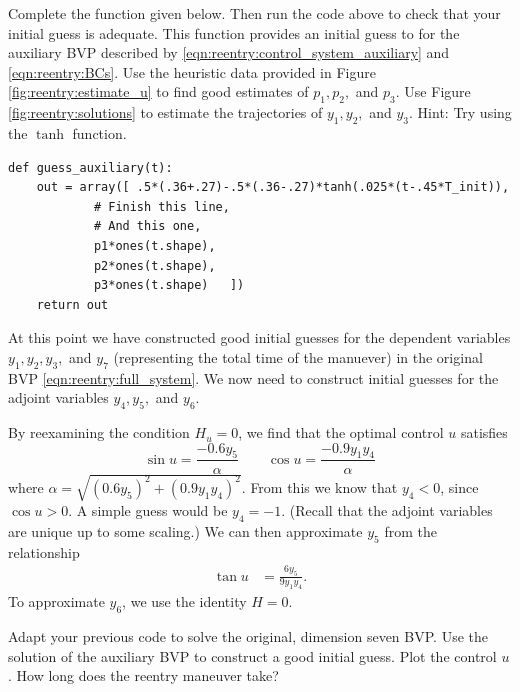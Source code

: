 \begin{problem}
	Complete the function  given below. Then run the code above to check that your initial guess is adequate. 
	This function provides an initial guess to  for the auxiliary BVP described by  \eqref{eqn:reentry:control_system_auxiliary} and \eqref{eqn:reentry:BCs}.
	Use the heuristic data provided in Figure \ref{fig:reentry:estimate_u} to find good estimates of $p_1, p_2,$ and $p_3$. 
	Use Figure \ref{fig:reentry:solutions} to estimate the trajectories of $y_1, y_2,$ and $y_3$. Hint: Try using the $\tanh$ function.
	
\begin{lstlisting}
def guess_auxiliary(t):
	out = array([ .5*(.36+.27)-.5*(.36-.27)*tanh(.025*(t-.45*T_init)),
			# Finish this line, 
			# And this one, 
			p1*ones(t.shape),
			p2*ones(t.shape),
			p3*ones(t.shape)   ])
	return out
\end{lstlisting}	
	\label{prob:reentry:guess}
\end{problem}

At this point we have constructed good initial guesses for the dependent variables $y_1,y_2, y_3,$ and $y_7$ (representing the total time of the manuever) in the original BVP \eqref{eqn:reentry:full_system}. 
We now need to construct initial guesses for the adjoint variables $y_4, y_5,$ and $y_6$. 

By reexamining the condition $H_u = 0$, we find that the optimal control $u$ satisfies 
\[
\sin u = \frac{-0.6 y_5}{\alpha} \qquad \cos u  = \frac{-0.9 y_1y_4}{\alpha}
\]
where $\alpha = \sqrt{(0.6y_5)^2 + (0.9y_1y_4)^2}$.
From this we know that $y_4 <0$, since $\cos u >0$. A simple guess would be $y_4 = -1$. 
(Recall that the adjoint variables are unique up to some scaling.) 
We can then approximate $y_5$ from the relationship 
\begin{align*}
\tan u &= \frac{6y_5}{9y_1y_4}.
\end{align*}
To approximate $y_6$, we use the identity $H = 0$.


\begin{problem}
	Adapt your previous code to solve the original, dimension seven BVP. 
	Use the solution of the auxiliary BVP to construct a good initial guess.
	Plot the control $u$. How long does the reentry maneuver take? 
\end{problem}

